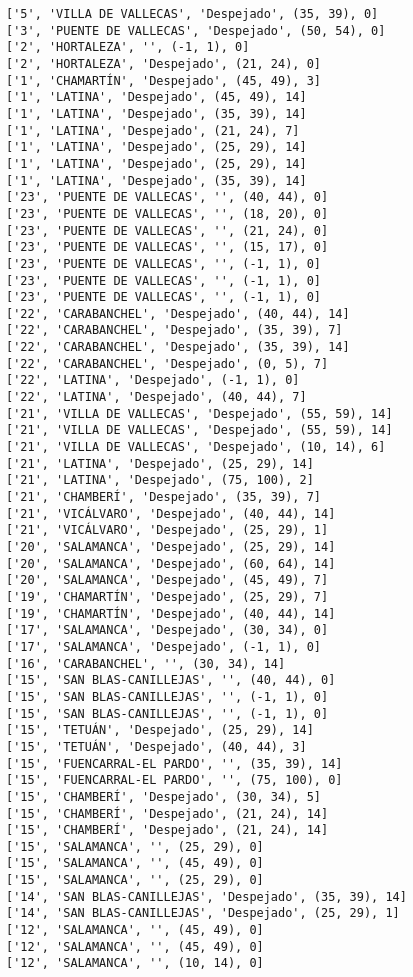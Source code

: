 \documentclass[11pt]{article}
\begin{document}
\begin{Verbatim}[commandchars=\\\{\}]
['5', 'VILLA DE VALLECAS', 'Despejado', (35, 39), 0]
['3', 'PUENTE DE VALLECAS', 'Despejado', (50, 54), 0]
['2', 'HORTALEZA', '', (-1, 1), 0]
['2', 'HORTALEZA', 'Despejado', (21, 24), 0]
['1', 'CHAMARTÍN', 'Despejado', (45, 49), 3]
['1', 'LATINA', 'Despejado', (45, 49), 14]
['1', 'LATINA', 'Despejado', (35, 39), 14]
['1', 'LATINA', 'Despejado', (21, 24), 7]
['1', 'LATINA', 'Despejado', (25, 29), 14]
['1', 'LATINA', 'Despejado', (25, 29), 14]
['1', 'LATINA', 'Despejado', (35, 39), 14]
['23', 'PUENTE DE VALLECAS', '', (40, 44), 0]
['23', 'PUENTE DE VALLECAS', '', (18, 20), 0]
['23', 'PUENTE DE VALLECAS', '', (21, 24), 0]
['23', 'PUENTE DE VALLECAS', '', (15, 17), 0]
['23', 'PUENTE DE VALLECAS', '', (-1, 1), 0]
['23', 'PUENTE DE VALLECAS', '', (-1, 1), 0]
['23', 'PUENTE DE VALLECAS', '', (-1, 1), 0]
['22', 'CARABANCHEL', 'Despejado', (40, 44), 14]
['22', 'CARABANCHEL', 'Despejado', (35, 39), 7]
['22', 'CARABANCHEL', 'Despejado', (35, 39), 14]
['22', 'CARABANCHEL', 'Despejado', (0, 5), 7]
['22', 'LATINA', 'Despejado', (-1, 1), 0]
['22', 'LATINA', 'Despejado', (40, 44), 7]
['21', 'VILLA DE VALLECAS', 'Despejado', (55, 59), 14]
['21', 'VILLA DE VALLECAS', 'Despejado', (55, 59), 14]
['21', 'VILLA DE VALLECAS', 'Despejado', (10, 14), 6]
['21', 'LATINA', 'Despejado', (25, 29), 14]
['21', 'LATINA', 'Despejado', (75, 100), 2]
['21', 'CHAMBERÍ', 'Despejado', (35, 39), 7]
['21', 'VICÁLVARO', 'Despejado', (40, 44), 14]
['21', 'VICÁLVARO', 'Despejado', (25, 29), 1]
['20', 'SALAMANCA', 'Despejado', (25, 29), 14]
['20', 'SALAMANCA', 'Despejado', (60, 64), 14]
['20', 'SALAMANCA', 'Despejado', (45, 49), 7]
['19', 'CHAMARTÍN', 'Despejado', (25, 29), 7]
['19', 'CHAMARTÍN', 'Despejado', (40, 44), 14]
['17', 'SALAMANCA', 'Despejado', (30, 34), 0]
['17', 'SALAMANCA', 'Despejado', (-1, 1), 0]
['16', 'CARABANCHEL', '', (30, 34), 14]
['15', 'SAN BLAS-CANILLEJAS', '', (40, 44), 0]
['15', 'SAN BLAS-CANILLEJAS', '', (-1, 1), 0]
['15', 'SAN BLAS-CANILLEJAS', '', (-1, 1), 0]
['15', 'TETUÁN', 'Despejado', (25, 29), 14]
['15', 'TETUÁN', 'Despejado', (40, 44), 3]
['15', 'FUENCARRAL-EL PARDO', '', (35, 39), 14]
['15', 'FUENCARRAL-EL PARDO', '', (75, 100), 0]
['15', 'CHAMBERÍ', 'Despejado', (30, 34), 5]
['15', 'CHAMBERÍ', 'Despejado', (21, 24), 14]
['15', 'CHAMBERÍ', 'Despejado', (21, 24), 14]
['15', 'SALAMANCA', '', (25, 29), 0]
['15', 'SALAMANCA', '', (45, 49), 0]
['15', 'SALAMANCA', '', (25, 29), 0]
['14', 'SAN BLAS-CANILLEJAS', 'Despejado', (35, 39), 14]
['14', 'SAN BLAS-CANILLEJAS', 'Despejado', (25, 29), 1]
['12', 'SALAMANCA', '', (45, 49), 0]
['12', 'SALAMANCA', '', (45, 49), 0]
['12', 'SALAMANCA', '', (10, 14), 0]

\end{Verbatim}
\end{document}

